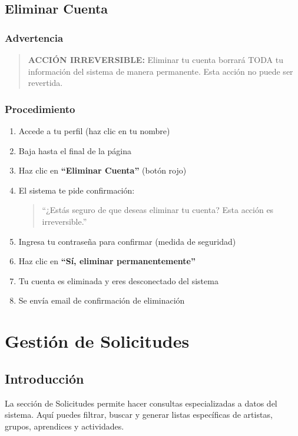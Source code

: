 \documentclass[12pt,a4paper,spanish,oneside]{report}
\begin{document}
\section{Eliminar Cuenta}

\subsection{Advertencia}

\begin{quote}
\textbf{ACCIÓN IRREVERSIBLE:} Eliminar tu cuenta borrará TODA tu información del sistema de manera permanente. Esta acción no puede ser revertida.
\end{quote}

\subsection{Procedimiento}

\begin{enumerate}
\item Accede a tu perfil (haz clic en tu nombre)
\item Baja hasta el final de la página
\item Haz clic en \textbf{``Eliminar Cuenta''} (botón rojo)
\item El sistema te pide confirmación:
\begin{quote}
``¿Estás seguro de que deseas eliminar tu cuenta? Esta acción es irreversible.''
\end{quote}
\item Ingresa tu contraseña para confirmar (medida de seguridad)
\item Haz clic en \textbf{``Sí, eliminar permanentemente''}
\item Tu cuenta es eliminada y eres desconectado del sistema
\item Se envía email de confirmación de eliminación
\end{enumerate}

\chapter{Gestión de Solicitudes}

\section{Introducción}

La sección de Solicitudes permite hacer consultas especializadas a datos del sistema. Aquí puedes filtrar, buscar y generar listas específicas de artistas, grupos, aprendices y actividades.
\end{document}
